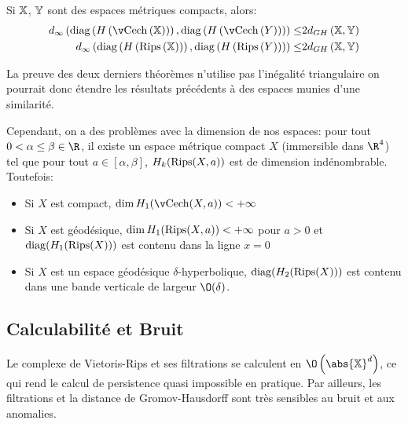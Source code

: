 \begin{thm}
	Si $\mathbb{X}$, $\mathbb{Y}$ sont des espaces métriques compacts, alors:
	\begin{align*}
		\dinf\left(\diag\left(H\left(\cech\left(\X\right)\right)\right), \diag\left(H\left(\cech\left(Y\right)\right)\right)\right) \leq & 2d_{GH}\left(\X, \Y\right) \\
		\dinf\left(\diag\left(H\left(\rips\left(\X\right)\right)\right), \diag\left(H\left(\rips\left(Y\right)\right)\right)\right) \leq & 2d_{GH}\left(\X, \Y\right) \\
	\end{align*}
\end{thm}
La preuve des deux derniers théorèmes n'utilise pas l'inégalité triangulaire on pourrait donc étendre les résultats précédents à des espaces munies d'une similarité.

\medskip

Cependant, on a des problèmes avec la dimension de nos espaces: pour tout $0 < \alpha \leq \beta \in \R$, il existe un
espace métrique compact $X$ (immersible dans $\R^{4}$) tel que pour tout $a \in [\alpha, \beta]$, $H_{k}(\operatorname{Rips}(X, a))$ est de dimension indénombrable.
Toutefois:
\begin{itemize}
	\item Si $X$ est compact, $\dim H_{1}(\cech(X, a)) < + \infty$
	\item Si $X$ est géodésique, $\dim H_{1}(\operatorname{Rips}(X, a)) < + \infty$ pour $a > 0$ et $\operatorname{diag}(H_{1}(\operatorname{Rips}(X)))$ est contenu dans la ligne $x = 0$
	\item Si $X$ est un espace géodésique $\delta$-hyperbolique, $\operatorname{diag}(H_{2}(\operatorname{Rips}(X)))$ est contenu dans une bande verticale de largeur $\O(\delta)$.
\end{itemize}

\subsection{Calculabilité et Bruit}
Le complexe de Vietoris-Rips et ses filtrations se calculent en $\O\left(\abs{\X}^{d}\right)$, ce qui rend le calcul de persistence quasi impossible en pratique.
Par ailleurs, les filtrations et la distance de Gromov-Hausdorff sont très sensibles au bruit et aux anomalies.

